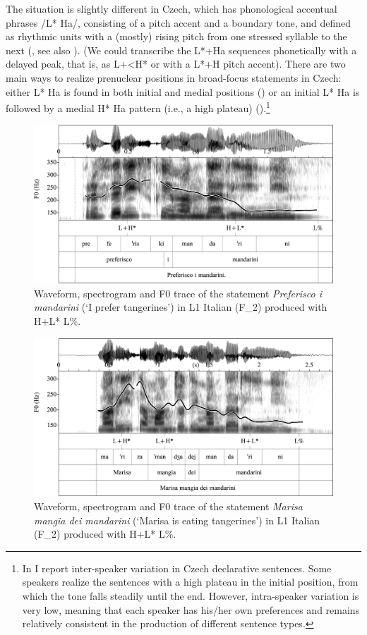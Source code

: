 The situation is slightly different in Czech, which has phonological accentual phrases /L* Ha/, consisting of a pitch accent and a boundary tone, and defined as rhythmic units with a (mostly) rising pitch from one stressed syllable to the next (\citealt{PeškováEtAl2018}, see also ). (We could transcribe the L*+Ha sequences phonetically with a delayed peak, that is, as L+<H* or with a L*+H pitch accent). There are two main ways to realize prenuclear positions in broad-focus statements in Czech: either L* Ha is found in both initial and medial positions () or an initial L* Ha is followed by a medial H* Ha pattern (i.e., a high plateau) ().{\footnote{In \citet{PeškováForthcoming} I report inter-speaker variation in Czech declarative sentences. Some speakers realize the sentences with a high plateau in the initial position, from which the tone falls steadily until the end. However, intra-speaker variation is very low, meaning that each speaker has his/her own preferences and remains relatively consistent in the production of different sentence types.}}


\begin{figure}[p]
\includegraphics[width=\textwidth]{figures/Figure_4.1.png}
\caption{Waveform, spectrogram and F0 trace of the statement \textit{Preferisco i mandarini} (‘I prefer tangerines’) in L1 Italian \mbox{(F\_2)} produced with H+L* L\%.}
\label{fig:4.1}
\end{figure}

\begin{figure}[p]
\includegraphics[width=\textwidth]{figures/Figure_4.2.png}
\caption{Waveform, spectrogram and F0 trace of the statement \textit{Marisa mangia dei mandarini} (‘Marisa is eating tangerines’) in L1 Italian \mbox{(F\_2)} produced with H+L* L\%.}
\label{fig:4.2}
\end{figure}

